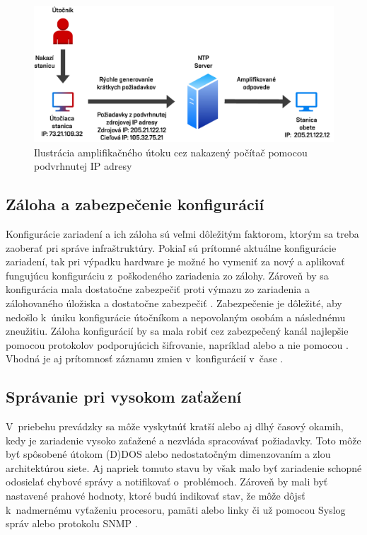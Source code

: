 \begin{figure}[H]
	\begin{center}
		\includegraphics[scale=0.75]{obrazky/ntp_amplification.pdf}
	\end{center}
	\caption[Ilustrácia amplifikačného útoku cez nakazený počítač pomocou podvrhnutej IP adresy]{Ilustrácia amplifikačného útoku cez nakazený počítač pomocou podvrhnutej IP adresy \cite{gTkmbyKon9H6tuAm}}
	\label{fig:ntp-amp}
\end{figure} 

\subsection{Záloha a zabezpečenie konfigurácií}
Konfigurácie zariadení a ich záloha sú veľmi dôležitým faktorom, ktorým sa treba zaoberať pri správe infraštruktúry. Pokiaľ sú prítomné aktuálne konfigurácie zariadení, tak pri výpadku hardware je možné ho vymeniť za nový a aplikovať fungujúcu konfiguráciu z~poškodeného zariadenia zo zálohy. Zároveň by sa konfigurácia mala dostatočne zabezpečiť proti výmazu zo zariadenia a zálohovaného úložiska a dostatočne zabezpečiť \cite{McMillan2018}. Zabezpečenie je dôležité, aby nedošlo k~úniku konfigurácie útočníkom a nepovolaným osobám a následnému zneužitiu. Záloha konfigurácií by sa mala robiť cez zabezpečený kanál najlepšie pomocou protokolov podporujúcich šifrovanie, napríklad  alebo  a nie pomocou  \cite{Singh2018}. Vhodná je aj prítomnosť záznamu zmien v~konfigurácií v~čase \cite{McMillan2018}.

\subsection{Správanie pri vysokom zaťažení}
V~priebehu prevádzky sa môže vyskytnúť kratší alebo aj dlhý časový okamih, kedy je zariadenie vysoko zaťažené a nezvláda spracovávať požiadavky. Toto môže byť spôsobené útokom (D)DOS alebo nedostatočným dimenzovaním a zlou architektúrou siete. Aj napriek tomuto stavu by však malo byť zariadenie schopné odosielať chybové správy a notifikovať o~problémoch. Zároveň by mali byť nastavené prahové hodnoty, ktoré budú indikovať stav, že môže dôjsť k~nadmernému vyťaženiu procesoru, pamäti alebo linky či už pomocou Syslog správ alebo protokolu SNMP \cite{uYLsMtQInofenpV3} \cite{Singh2018}.

